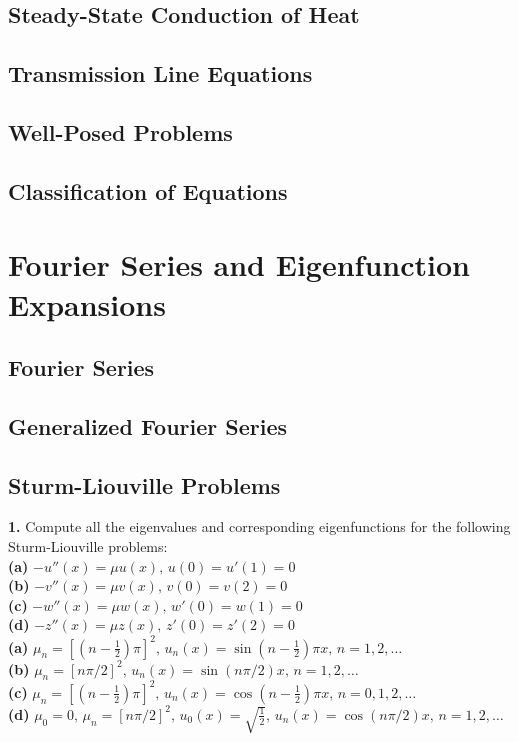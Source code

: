 \documentclass{amsbook}%
\theoremstyle{plain}
\numberwithin{equation}{section}
\begin{document}
	\section{Steady-State Conduction of Heat}
	
	\section{Transmission Line Equations}
	
	\section{Well-Posed Problems}
	
	\section{Classification of Equations}

\chapter{Fourier Series and Eigenfunction Expansions}

	\section{Fourier Series}
	
	\section{Generalized Fourier Series}
	
	\section{Sturm-Liouville Problems}
	
		\noindent\textbf{1.} Compute all the eigenvalues and corresponding eigenfunctions for the following Sturm-Liouville problems:\\
		\textbf{(a)} $-u''(x)=\mu u(x),\,u(0)=u'(1)=0$\\
		\textbf{(b)} $-v''(x)=\mu v(x),\,v(0)=v(2)=0$\\
		\textbf{(c)} $-w''(x)=\mu w(x),\,w'(0)=w(1)=0$\\
		\textbf{(d)} $-z''(x)=\mu z(x),\,z'(0)=z'(2)=0$
		\\[12pt]
		\textbf{(a)} $\mu_n=[(n-\frac{1}{2})\pi]^2,\,u_n(x)=\sin{(n-\frac{1}{2})\pi x},\,n=1,2,\ldots$\\
		\textbf{(b)} $\mu_n=[n\pi/2]^2,\,u_n(x)=\sin{(n\pi/2)x},\,n=1,2,\ldots$\\
		\textbf{(c)} $\mu_n=[(n-\frac{1}{2})\pi]^2,\,u_n(x)=\cos{(n-\frac{1}{2})\pi x},\,n=0,1,2,\ldots$\\
		\textbf{(d)} $\mu_0=0,\,\mu_n=[n\pi/2]^2,\,u_0(x)=\sqrt{\frac{1}{2}},\,u_n(x)=\cos{(n\pi/2)x},\,n=1,2,\ldots$
		\\[12pt]		
	
\end{document}
